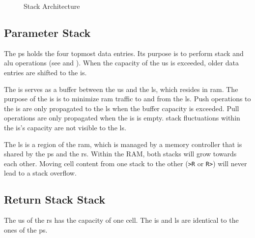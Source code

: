 \begin{figure}[!h]
\begin{center}
{{
    }
  }
  \caption{Stack Architecture}
  \label{stacks:fig}
  \end{center}
\end{figure}

\subsection{Parameter Stack}
\label{stacks:ps}

The  \gls{ps} holds the four topmost data entries.
Its purpose is to perform stack and \gls{alu} operations
(see  and ).
When the capacity of the \gls{us} is exceeded, older data entries are shifted
to the \gls{is}.

The \gls{is} serves as a buffer between the \gls{us} and the \gls{ls}, which resides
in \gls{ram}. The purpose of the \gls{is} is to minimize \gls{ram} traffic to and
from the \gls{ls}.
Push operations to the \gls{is} are only propagated to the \gls{ls} when the buffer
capacity is exceeded. Pull operations are only propagated when the \gls{is} is empty.
\Gls{stack} fluctuations within the \gls{is}'s capacity are not visible to the \gls{ls}.

The \gls{ls} is a region of the \gls{ram}, which is managed by a memory controller
that is shared by the \gls{ps} and the \gls{rs}. Within the RAM, both stacks will
grow towards each other. Moving cell content from one stack to the other (\texttt{>R} 
or \texttt{R>}) will never lead to a stack overflow. 

\subsection{Return Stack Stack}
\label{stacks:ps}

The \gls{us} of the \gls{rs} has the capacity of one \gls{cell}. The \gls{is} and
\gls{ls} are identical to the ones of the \gls{ps}.
